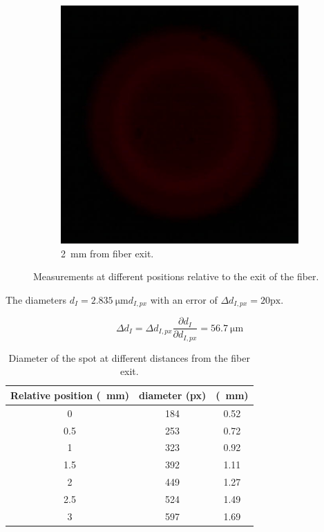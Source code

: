 \documentclass[a4paper, 12pt]{paper}
\begin{document}
\begin{figure}[H]
\begin{subfigure}[b]{0.45\textwidth}
        \includegraphics[width=\textwidth]{img/led_2}
        \caption{\SI{2}{\milli\meter} from fiber exit.}
    \end{subfigure}
    \caption{Measurements at different positions relative to the exit of the fiber.}
\label{fig:acceptance_angle_2}
\end{figure}

The diameters $ d_I = \SI{2.835}{\micro\meter} d_{I,px}$ with an error of $\Delta d_{I,px} = 20 \mbox{px}$.

\begin{equation}
    \Delta d_I = \Delta d_{I,px} \frac{\partial d_I}{\partial d_{I,px}} =\SI{56.7}{\micro\meter}
    \label{equ:diam_error}
\end{equation}

\begin{table}[H]
    \centering
    \begin{tabular}{S[table-format=1.1] S[table-format=3.0] S[table-format=1.2]}
        \toprule
        {Relative position (\SI{}{\milli\meter})} & {diameter (px)} & {(\SI{}{\milli\meter})} \\
           & 184 & 0.52 \\
        0.5 & 253 & 0.72 \\
        1   & 323 & 0.92 \\
        1.5 & 392 & 1.11 \\
        2   & 449 & 1.27 \\
        2.5 & 524 & 1.49 \\
        3   & 597 & 1.69 \\
        \bottomrule
    \end{tabular}
    \caption{Diameter of the spot at different distances from the fiber exit.}
\label{tab:diams}
\end{table}
\end{document}
